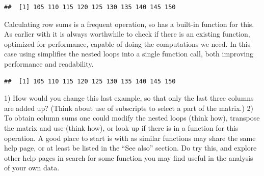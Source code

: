 \documentclass[krantz2]{krantz}\usepackage{knitr}%
\begin{document}
\begin{explainbox}
\begin{knitrout}\footnotesize
{}\color{fgcolor}\begin{kframe}
\begin{alltt}
 \hlkwb{<-}   \hlstd{=}  
\end{alltt}
\begin{verbatim}
##  [1] 105 110 115 120 125 130 135 140 145 150
\end{verbatim}
\end{kframe}
\end{knitrout}
Calculating row sums is a frequent operation, so \Rlang has a built-in function for this. As earlier with  it is always worthwhile to check if there is an existing \Rlang function, optimized for performance, capable of doing the computations we need. In this case using  simplifies the nested loops into a single function call, both improving performance and readability.

\begin{knitrout}\footnotesize
{}\color{fgcolor}\begin{kframe}
\begin{alltt}
\end{alltt}
\begin{verbatim}
##  [1] 105 110 115 120 125 130 135 140 145 150
\end{verbatim}
\end{kframe}
\end{knitrout}

\end{explainbox}

\begin{playground}
1) How would you change this last example, so that only the last three columns are added up? (Think about use of subscripts to select a part of the matrix.)
2) To obtain column sums one could modify the nested loops (think how), transpose the matrix and use  (think how), or look up if there is in \Rlang a function for this operation. A good place to start is with  as similar functions may share the same help page, or at least be listed in the ``See also'' section. Do try this, and explore other help pages in search for some function you may find useful in the analysis of your own data.
\end{playground}
\end{document}
